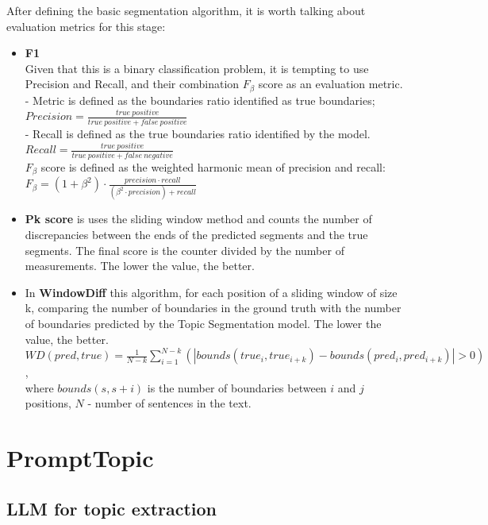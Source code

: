 \documentclass[PMI,VKR]{HSEUniversity}
\begin{document}
After defining the basic segmentation algorithm, it is worth talking about evaluation metrics for this stage:
\begin{itemize}
    \item \textbf{F1}\\
    Given that this is a binary classification problem, it is tempting to use Precision and Recall, and their combination $F_{\beta}$ score as an evaluation metric. \\ 
     - Metric is defined as the boundaries ratio identified as true boundaries; \\
       $Precision = \frac{true \: positive}{true \: positive + false \: positive}$ \\
     - Recall is defined as the true boundaries ratio identified by the model. \\
       $Recall = \frac{true \: positive}{true \: positive + false \: negative}$ \\
    $F_{\beta}$ score is defined as the weighted harmonic mean of precision and recall: \\
    $F_{\beta} = (1 + \beta^{2}) \cdot \frac{precision \cdot recall}{(\beta^{2} \cdot precision) + recall}$
    \item \textbf{Pk score} \cite{pk:1999} is uses the sliding window method and counts the number of discrepancies between the ends of the predicted segments and the true segments. The final score is the counter divided by the number of measurements. The lower the value, the better.
    \item In \textbf{WindowDiff} \cite{wd:2002} this algorithm, for each position of a sliding window of size k, comparing the number of boundaries in the ground truth with the number of boundaries predicted by the Topic Segmentation model. The lower the value, the better.\\
    $WD(pred, true) = \frac{1}{N - k}\sum_{i = 1}^{N - k}(\left\lvert bounds(true_{i}, true_{i + k}) - bounds(pred_{i}, pred_{i + k}) \right\rvert > 0)$, \\ 
    where $bounds(s, s + i)$ is the number of boundaries between $i$ and $j$ positions, $N$ - number of sentences in the text.
\end{itemize} 


\section{PromptTopic}


\subsection{LLM for topic extraction}
\end{document}
